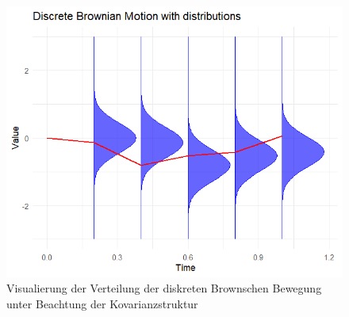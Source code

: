\begin{bem}
\begin{figure}[H]
    \centering
    \includegraphics[width=\textwidth]{images/bb_with_cov.png}
    \caption{Visualierung der Verteilung der diskreten Brownschen Bewegung unter Beachtung der Kovarianzstruktur}
    \label{fig:bb_with_cov}

\end{figure}
\end{bem}

